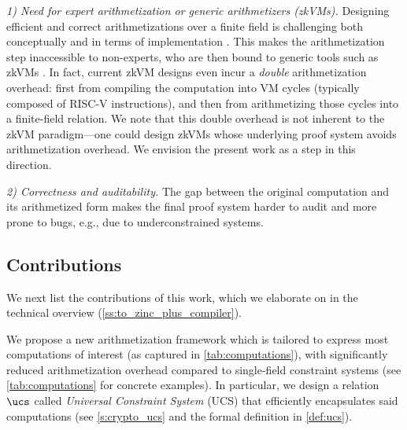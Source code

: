 \emph{1) Need for expert arithmetization or generic arithmetizers (zkVMs).} Designing efficient and correct arithmetizations over a finite field is challenging both conceptually and in terms of implementation \cite{PailoorUnderconstrained,WenZKPSecurity}. This makes the arithmetization step inaccessible to non-experts, who are then bound to generic tools such as zkVMs \cite{Cairo,Jolt}. In fact, current zkVM designs even incur a \emph{double} arithmetization overhead: first from compiling the computation into VM cycles (typically composed of RISC-V instructions), and then from arithmetizing those cycles into a finite-field relation. We note that this double overhead is not inherent to the zkVM paradigm---one could design zkVMs whose underlying proof system avoids arithmetization overhead. We envision the present work as a step in this direction.

\emph{2) Correctness and auditability.} The gap between the original computation and its arithmetized form makes the final proof system harder to audit and more prone to bugs, e.g., due to underconstrained systems.


\subsection{Contributions}
\label{sec:zinc-contributions}

We next list the contributions of this work, which we elaborate on in the technical overview (\cref{ss:to_zinc_plus_compiler}).

We propose a new arithmetization framework which is tailored to express most computations of interest (as captured in \cref{tab:computations}), with significantly reduced arithmetization overhead compared to single-field constraint systems (see \cref{tab:computations} for concrete examples). In particular, we design a relation $\ucs$ called \emph{Universal Constraint System} (UCS) that efficiently encapsulates said computations (see \cref{s:crypto_ucs} and the formal definition in \cref{def:ucs}).  

